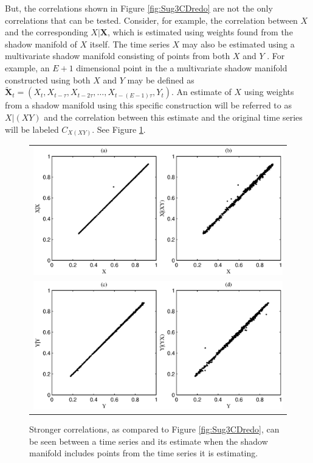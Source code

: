 \documentclass[twocolumn,aps,pre,groupedaddress]{revtex4-1}
\begin{document}
But, the correlations shown in Figure \ref{fig:Sug3CDredo} are not the only correlations that can be tested.  Consider, for example, the correlation between $X$ and the corresponding $X|\mathbf{X}$, which is estimated using weights found from the shadow manifold of $X$ itself.  The time series $X$ may also be estimated using a multivariate shadow manifold consisting of points from both $X$ and $Y$ \cite{Deyle2013}.  For example, an $E+1$ dimensional point in the a multivariate shadow manifold constructed using both $X$ and $Y$ may be defined as $\tilde{\mathbf{X}}_t=(X_t,X_{t-\tau},X_{t-2\tau},\ldots,X_{t-(E-1)\tau},Y_t)$.  An estimate of $X$ using weights from a shadow manifold using this specific construction will be referred to as $X|(XY)$ and the correlation between this estimate and the original time series will be labeled $C_{X(XY)}$.  See Figure \ref{fig:PAIintro}.
\begin{figure}[ht]
\begin{tabular}{c}
\includegraphics[scale=0.5]{SugFig3CD_AddPlotAB.eps} \\
\includegraphics[scale=0.5]{SugFig3CD_AddPlotCD.eps}
\end{tabular}
\caption{Stronger correlations, as compared to Figure \ref{fig:Sug3CDredo}, can be seen between a time series and its estimate when the shadow manifold includes points from the time series it is estimating.}
\label{fig:PAIintro}
\end{figure}
\end{document}
